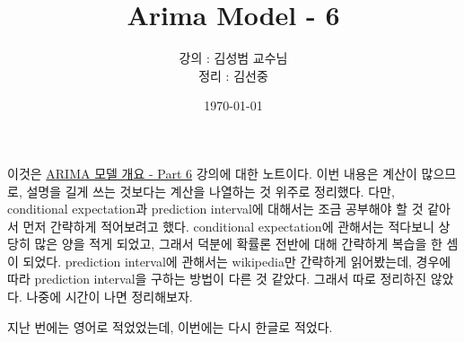 \documentclass{article}
\begin{document}
\title{Arima Model - 6}
\author{강의 : 김성범 교수님\\ 정리 :  김선중}
\date{\today}
\maketitle

이것은 \href{https://youtu.be/K7GWJ3iC6OY}{ARIMA 모델 개요 - Part 6} 강의에 대한 노트이다.
이번 내용은 계산이 많으므로, 설명을 길게 쓰는 것보다는 계산을 나열하는 것 위주로 정리했다.
다만, conditional expectation과 prediction interval에 대해서는 조금 공부해야 할 것 같아서 먼저 간략하게 적어보려고 했다.
conditional expectation에 관해서는 적다보니 상당히 많은 양을 적게 되었고, 그래서 덕분에 확률론 전반에 대해 간략하게 복습을 한 셈이 되었다.
prediction interval에 관해서는 wikipedia만 간략하게 읽어봤는데, 경우에 따라 prediction interval을 구하는 방법이 다른 것 같았다.
그래서 따로 정리하진 않았다.
나중에 시간이 나면 정리해보자.

지난 번에는 영어로 적었었는데, 이번에는 다시 한글로 적었다.
\tableofcontents
\end{document}
